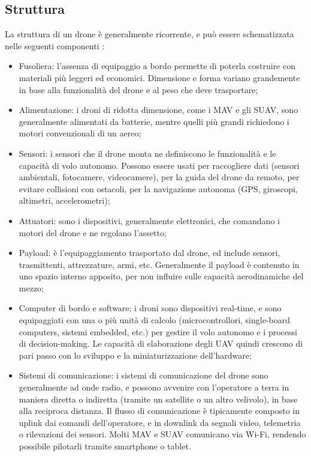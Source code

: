 \subsection[Struttura]{Struttura}
La struttura di un drone è generalmente ricorrente, e può essere schematizzata nelle seguenti componenti \cite{fanet}:
\begin{itemize}
	\item Fusoliera: l'assenza di equipaggio a bordo permette di poterla costruire con materiali più leggeri ed economici. Dimensione e forma variano grandemente in base alla funzionalità del drone e al peso che deve trasportare;
	\item Alimentazione: i droni di ridotta dimensione, come i MAV e gli SUAV, sono generalmente alimentati da batterie, mentre quelli più grandi richiedono i motori convenzionali di un aereo;
	\item Sensori: i sensori che il drone monta ne definiscono le funzionalità e le capacità di volo autonomo. Possono essere usati per raccogliere dati (sensori ambientali, fotocamere, videocamere), per la guida del drone da remoto, per evitare collisioni con ostacoli, per la navigazione autonoma (GPS, giroscopi, altimetri, accelerometri);
	\item Attuatori: sono i dispositivi, generalmente elettronici, che comandano i motori del drone e ne regolano l'assetto;
	\item Payload: è l'equipaggiamento trasportato dal drone, ed include sensori, trasmittenti, attrezzature, armi, etc. Generalmente il payload è contenuto in uno spazio interno apposito, per non influire sulle capacità aerodinamiche del mezzo;
	\item Computer di bordo e software: i droni sono dispositivi real-time, e sono equipaggiati con una o più unità di calcolo (microcontrollori, single-board computers, sistemi embedded, etc.)  per gestire il volo autonomo e i processi di decision-making. Le capacità di elaborazione degli UAV quindi crescono di pari passo con lo sviluppo e la miniaturizzazione dell'hardware;
	\item Sistemi di comunicazione: i sistemi di comunicazione del drone sono generalmente ad onde radio, e possono avvenire con l'operatore a terra in maniera diretta o indiretta (tramite un satellite o un altro velivolo), in base alla reciproca distanza. Il flusso di comunicazione è tipicamente composto in uplink dai comandi dell'operatore, e in downlink da segnali video, telemetria o rilevazioni dei sensori. Molti  MAV e SUAV comunicano via Wi-Fi, rendendo possibile pilotarli tramite smartphone o tablet.  
\end{itemize}

